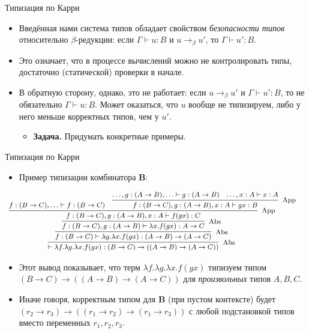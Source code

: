 \documentclass[xcolor=dvipsnames]{beamer}
\newcommand{\Bx}{\mathbf{B}}
\begin{document}
\begin{frame}{Типизация по Карри}
 
 \begin{itemize}[<+->]
  \item Введённая нами система типов обладает свойством {\em безопасности типов} относительно $\beta$-редукции: если $\Gamma \vdash u : B$ и $u \to_\beta u'$, то $\Gamma \vdash u' : B$.
  \item Это означает, что в процессе вычислений можно не контролировать типы, достаточно (статической) проверки в начале.
  \item В обратную сторону, однако, это не работает: если $u \to_\beta u'$ и $\Gamma \vdash u' : B$, то не обязательно $\Gamma \vdash u : B$. Может оказаться, что $u$ вообще не типизируем, либо у него меньше корректных типов, чем у $u'$.
  \begin{itemize}
   \item {\bf Задача.} Придумать конкретные примеры.
  \end{itemize}

 \end{itemize}

\end{frame}


\begin{frame}{Типизация по Карри}
 
\begin{itemize}[<+->]
 \item 
 Пример типизации комбинатора $\Bx$:
 
 $$\footnotesize\hspace*{-3em}
\infer[\mathrm{Abs}]{\vdash \lambda f. \lambda g. \lambda x. f(gx) :
(B \to C) \to ((A \to B) \to (A \to C))}
{\infer[\mathrm{Abs}]{f : (B \to C) \vdash \lambda g. \lambda x. f(gx) :
(A \to B) \to (A \to C)}
{\infer[\mathrm{Abs}]{f : (B \to C), g : (A \to B) \vdash \lambda x. f(gx) :
A \to C}
{\infer[\mathrm{App}]{f : (B \to C), g : (A \to B), x : A \vdash f(gx) : C}
{f : (B \to C), \ldots \vdash f:(B \to C) & 
\infer[\mathrm{App}]{f : (B \to C), g : (A \to B), x : A \vdash gx : B}{\ldots, g : (A \to B), \ldots \vdash g : (A \to B) & \ldots, x : A \vdash x : A}}}}}
$$

\item Этот вывод показывает, что терм $\lambda f. \lambda g. \lambda x. f(gx)$ типизуем типом $(B \to C) \to ((A \to B) \to (A \to C))$ для {\em произвольных} типов $A,B,C$.

\item Иначе говоря, корректным типом для $\Bx$ (при пустом контексте) будет $(r_2 \to r_3) \to ((r_1 \to r_2) \to (r_1 \to r_3))$ с любой подстановкой типов вместо переменных $r_1, r_2, r_3$.
\end{itemize}

 
\end{frame}
\end{document}
